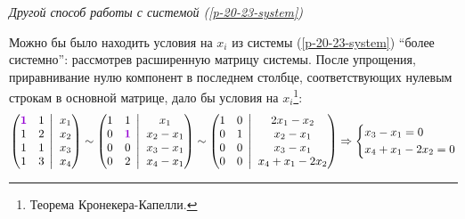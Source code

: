 \documentclass[a4paper,12pt]{article}
\newcommand{\BigMiddleFour}{\;\left|\vphantom{\begin{pmatrix} 0\\0\\0\\0 \end{pmatrix}}\right.\;}
\begin{document}
\begin{solution}
    \bigskip
    
    \emph{Другой способ работы с системой (\ref{p-20-23-system})}
    
    Можно бы было находить условия на $x_i$ из системы (\ref{p-20-23-system}) ``более системно'': рассмотрев расширенную матрицу системы.
    После упрощения, приравнивание нулю компонент в последнем столбце, соответствующих нулевым строкам в основной матрице, дало бы условия на $x_i$\footnote{Теорема Кронекера-Капелли.}:
    \[
      \left(
        \begin{matrix}
          \textcolor{violet}{\bds 1} & 1\\
          1 & 2\\
          1 & 1\\
          1 & 3
        \end{matrix} \BigMiddleFour \begin{matrix}
          x_1 \\ x_2 \\ x_3 \\ x_4
        \end{matrix}
      \right)
      \sim \left(
        \begin{matrix}
          1 & 1\\
          0 & \textcolor{violet}{\bds 1}\\
          0 & 0\\
          0 & 2
        \end{matrix} \BigMiddleFour \begin{matrix}
          x_1 \\ x_2 - x_1 \\ x_3 - x_1 \\ x_4 - x_1
        \end{matrix}
      \right)
      \sim \left(
        \begin{matrix}
          1 & 0\\
          0 & 1\\
          0 & 0\\
          0 & 0
        \end{matrix} \BigMiddleFour \begin{matrix}
          2x_1 - x_2 \\ x_2 - x_1 \\ x_3 - x_1 \\ x_4 + x_1 - 2x_2
        \end{matrix}
      \right)
      \Rightarrow \left\{
        \begin{aligned}
          &x_3 - x_1 = 0\\
          &x_4 + x_1 - 2x_2 = 0
        \end{aligned}
      \right.
    \]
  \end{solution}
  
\end{document}
